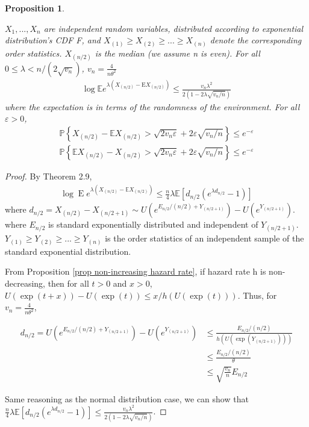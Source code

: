 \documentclass{article}
\theoremstyle{plain}
\newtheorem{prop}{Proposition}
\begin{document}
\begin{prop}
\label{prop 4.6}

$X_1, ..., X_n$ are independent random variables, distributed according to exponential distribution's CDF F, and $X_{(1)} \geq X_{(2)} \geq ... \geq X_{(n)}$ denote the corresponding order statistics. $X_{(n/2)}$ is the median (we assume n is even). For all $0 \leq \lambda<n /\left(2 \sqrt{v_{n}}\right)$, $v_n = \frac{4}{n \theta^2}$ 
\begin{align}
    \log \mathbb{E}e^{\lambda\left(X_{(n / 2)}-\mathrm{E} X_{(n / 2)}\right)} \leq \frac{v_{n} \lambda^{2}}{2\left(1-2 \lambda \sqrt{v_{n} / n}\right)}
\end{align}
where the expectation is in terms of the randomness of the environment. For all $\varepsilon > 0$,
\begin{align} 
    \label{inequality Bernstein upper bound for exp}
    \mathbb{P}\left\{X_{(n / 2)}-\mathbb{E} X_{(n / 2)}>\sqrt{2 v_{n} \varepsilon}+2 \varepsilon \sqrt{v_{n} / n}\right\} \leq e^{-\varepsilon}\\
    \label{inequality Bernstein lower bound for exp}
    \mathbb{P}\left\{\mathbb{E} X_{(n / 2)} - X_{(n / 2)}>\sqrt{2 v_{n} \varepsilon}+2 \varepsilon \sqrt{v_{n} / n}\right\} \leq e^{-\varepsilon}
\end{align}
\end{prop}

\begin{proof}
By \cite{boucheron2012} Theorem 2.9, 
\begin{align}
    \log \operatorname{E} e^{\lambda\left(X_{(n / 2)}-\mathbb{E} X_{(n / 2)}\right)} \leq \frac{n}{4} \lambda \mathbb{E}\left[d_{n / 2}\left(e^{\lambda d_{n / 2}}-1\right)\right]
\end{align}
where $d_{n / 2}=X_{(n / 2)}-X_{(n / 2+1)} \sim U\left(e^{E_{n / 2} /(n / 2)+Y_{(n / 2+1)}} \right)-U\left(e^{Y_{(n / 2+1)}}\right).$ where $E_{n/2}$ is standard exponentially distributed and independent of $Y_{(n/2 + 1)}$. $Y_{(1)} \geq Y_{(2)} \geq ... \geq Y_{(n)}$ is the order statistics of an independent sample of the standard exponential distribution. 

From Proposition \ref{prop non-increasing hazard rate}, if hazard rate h is non-decreasing, then for all $t > 0$ and $x > 0$, $U(\exp (t+x))-U(\exp (t)) \leq x / h(U(\exp (t)))$. Thus, for $v_n = \frac{4}{n \theta^2}$,

\begin{align}
    d_{n/2} = U\left(e^{E_{n / 2} /(n / 2)+Y_{(n / 2+1)}} \right)-U\left(e^{Y_{(n / 2+1)}}\right) 
    & \leq \frac{E_{n / 2} /(n / 2)}{h(U(\exp{(Y_{(n/2+1)})}))}\\
    &\leq \frac{E_{n / 2} /(n / 2)}{\theta}\\
    & \leq \sqrt{\frac{v_n}{n}} E_{n/2}
\end{align}

Same reasoning as the normal distribution case, we can show that $\frac{n}{4} \lambda \mathbb{E}\left[d_{n / 2}\left(e^{\lambda d_{n / 2}}-1\right)\right] \leq \frac{v_{n} \lambda^{2}}{2\left(1-2 \lambda \sqrt{v_{n} / n}\right)}$.
\end{proof}
\end{document}
